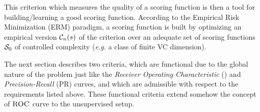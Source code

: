This criterion which measures the quality of a scoring function is then a tool for building/learning a good scoring function.
According to the Empirical Risk Minimization (ERM) paradigm, a scoring function is built by optimizing  an empirical version $\crit_n(s)$ of the criterion over an adequate set of scoring functions $\S_0$ of controlled complexity (\textit{e.g.} a class of finite {\sc VC} dimension). %

The next section describes two criteria, which are functional due to the global nature of the problem just like the \emph{Receiver Operating Characteristic} (\roc) and \emph{Precision-Recall} (PR) curves, and which are admissible with respect to the requirements listed above. These functional criteria extend somehow the concept of $\roc$ curve to the unsupervised setup.

